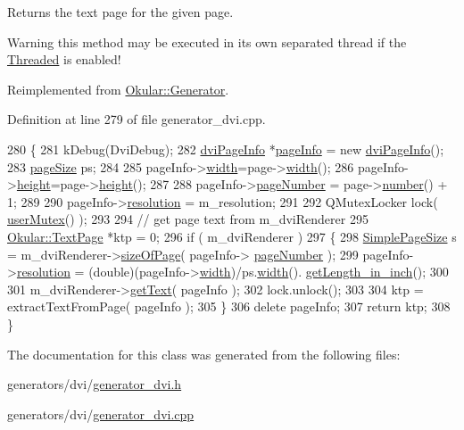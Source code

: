 Returns the text page for the given {\ttfamily page}.

\begin{DoxyWarning}{Warning}
this method may be executed in its own separated thread if the \hyperlink{classOkular_1_1Generator_a8517096896273a5ba5b970be09313c77a0764a910b194896e72da084c3c51a2d0}{Threaded} is enabled! 
\end{DoxyWarning}


Reimplemented from \hyperlink{classOkular_1_1Generator_af7915b97ab4b9347fb76babdda212cef}{Okular\+::\+Generator}.



Definition at line 279 of file generator\+\_\+dvi.\+cpp.


\begin{DoxyCode}
280 \{
281     kDebug(DviDebug);
282     \hyperlink{classdviPageInfo}{dviPageInfo} *\hyperlink{classpageInfo}{pageInfo} = \textcolor{keyword}{new} \hyperlink{classdviPageInfo}{dviPageInfo}();
283     \hyperlink{classpageSize}{pageSize} ps;
284     
285     pageInfo->\hyperlink{classdviPageInfo_ae69134192cb1f4a18c3eb8e52e52be73}{width}=page->\hyperlink{classOkular_1_1Page_a57114e88281da2a51b1bb0d5d4996d53}{width}();
286     pageInfo->\hyperlink{classdviPageInfo_af6aae8bcca7fab26e073f0cda75197ad}{height}=page->\hyperlink{classOkular_1_1Page_a67246a32b3e625946eb5c685b8372a4f}{height}();
287 
288     pageInfo->\hyperlink{classdviPageInfo_a53def64ce72621ae5c95524cec77ee2e}{pageNumber} = page->\hyperlink{classOkular_1_1Page_a6eee5f157a130b47d81ddd63e501664b}{number}() + 1;
289 
290     pageInfo->\hyperlink{classdviPageInfo_a1a941bfcf6edfb69562bccf5f392a268}{resolution} = m\_resolution;
291 
292     QMutexLocker lock( \hyperlink{classOkular_1_1Generator_a83d702cccbce2288c3258d97f1f15e19}{userMutex}() );
293 
294     \textcolor{comment}{// get page text from m\_dviRenderer}
295     \hyperlink{classOkular_1_1TextPage}{Okular::TextPage} *ktp = 0;
296     \textcolor{keywordflow}{if} ( m\_dviRenderer )
297     \{
298         \hyperlink{classSimplePageSize}{SimplePageSize} s = m\_dviRenderer->\hyperlink{classdviRenderer_a8d5430b14cdc4bdf6579402004f31317}{sizeOfPage}( pageInfo->
      \hyperlink{classdviPageInfo_a53def64ce72621ae5c95524cec77ee2e}{pageNumber} );
299         pageInfo->\hyperlink{classdviPageInfo_a1a941bfcf6edfb69562bccf5f392a268}{resolution} = (double)(pageInfo->\hyperlink{classdviPageInfo_ae69134192cb1f4a18c3eb8e52e52be73}{width})/ps.\hyperlink{classSimplePageSize_a5866f4c04635b09ec065a1fc45f9d1df}{width}().
      \hyperlink{classLength_afbaef4ba8d8a3e97873ed5cfd20c7dea}{getLength\_in\_inch}();
300 
301         m\_dviRenderer->\hyperlink{classdviRenderer_a8e14acc0c7dffed62d4af08c8bf9226c}{getText}( pageInfo );
302         lock.unlock();
303 
304         ktp = extractTextFromPage( pageInfo );
305     \}
306     \textcolor{keyword}{delete} pageInfo;
307     \textcolor{keywordflow}{return} ktp;
308 \}
\end{DoxyCode}


The documentation for this class was generated from the following files\+:\begin{DoxyCompactItemize}
\item 
generators/dvi/\hyperlink{generator__dvi_8h}{generator\+\_\+dvi.\+h}\item 
generators/dvi/\hyperlink{generator__dvi_8cpp}{generator\+\_\+dvi.\+cpp}\end{DoxyCompactItemize}
